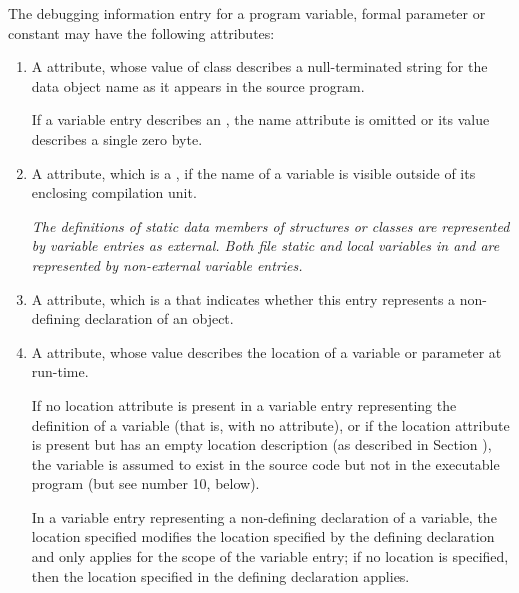 The debugging information entry for a program variable,
formal parameter or constant may have the following attributes:
\begin{enumerate}[1. ]
\item A \DWATname{} attribute,
whose value of class \CLASSstring{} describes a null-terminated
string for the data object name as it appears in the
source program.

If a variable entry describes an 
,
the name attribute is omitted or its value describes a single
zero byte.

\item A \DWATexternal{} attribute, 
\hypertarget{chap:DWATexternalexternalvariable}{}
which 
is a , if the name
of a variable is visible outside of its enclosing compilation
unit.  

\textit{The definitions of  static data members of structures
or classes are represented by variable entries  as
external. Both file static and local variables in  and 
are represented by non-external variable entries.
}

\item A \DWATdeclaration{} attribute, 
which is a  that
indicates whether this entry represents a non-defining
declaration of an object.

\item A \DWATlocation{} attribute,
whose value describes the location of a variable or parameter at run-time.

If no location attribute is present in a variable 
entry representing the definition of a variable (that is,
with no 
\DWATdeclaration{} attribute),
or if the location attribute is present but has
an empty location description (as described in Section ),
the variable is assumed to exist in the source code but not
in the executable program (but see number 10, below).

In a variable entry representing a non-defining declaration of a variable, the location
specified modifies the location specified by the defining declaration and only applies for the
scope of the variable entry; if no location is specified, then the location specified in the
defining declaration applies.


\end{enumerate}
